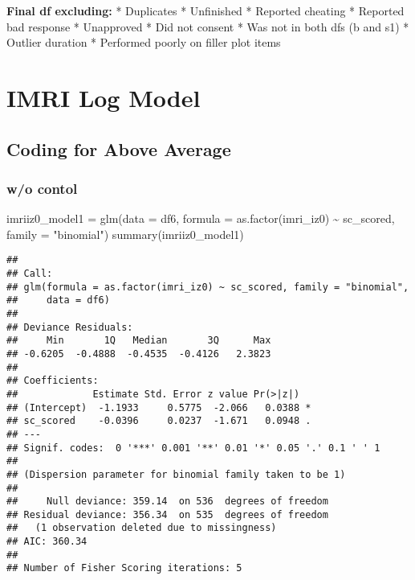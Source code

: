 \documentclass[
]{article}
\newenvironment{Shaded}{\begin{snugshade}}{\end{snugshade}}
\newcommand{\AttributeTok}[1]{\textcolor[rgb]{0.77,0.63,0.00}{#1}}
\newcommand{\FunctionTok}[1]{\textcolor[rgb]{0.00,0.00,0.00}{#1}}
\newcommand{\NormalTok}[1]{#1}
\newcommand{\OtherTok}[1]{\textcolor[rgb]{0.56,0.35,0.01}{#1}}
\newcommand{\SpecialCharTok}[1]{\textcolor[rgb]{0.00,0.00,0.00}{#1}}
\newcommand{\StringTok}[1]{\textcolor[rgb]{0.31,0.60,0.02}{#1}}
\begin{document}
\textbf{Final df excluding:} * Duplicates * Unfinished * Reported
cheating * Reported bad response * Unapproved * Did not consent * Was
not in both dfs (b and s1) * Outlier duration * Performed poorly on
filler plot items

\hypertarget{imri-log-model}{%
\section{IMRI Log Model}\label{imri-log-model}}

\hypertarget{coding-for-above-average-1}{%
\subsection{Coding for Above Average}\label{coding-for-above-average-1}}

\hypertarget{wo-contol}{%
\subsubsection{w/o contol}\label{wo-contol}}

\begin{Shaded}
\begin{Highlighting}[]
\NormalTok{imriiz0\_model1 }\OtherTok{=} \FunctionTok{glm}\NormalTok{(}\AttributeTok{data =}\NormalTok{ df6, }\AttributeTok{formula =} \FunctionTok{as.factor}\NormalTok{(imri\_iz0) }\SpecialCharTok{\textasciitilde{}}\NormalTok{ sc\_scored, }\AttributeTok{family =} \StringTok{"binomial"}\NormalTok{)}
\FunctionTok{summary}\NormalTok{(imriiz0\_model1)}
\end{Highlighting}
\end{Shaded}

\begin{verbatim}
## 
## Call:
## glm(formula = as.factor(imri_iz0) ~ sc_scored, family = "binomial", 
##     data = df6)
## 
## Deviance Residuals: 
##     Min       1Q   Median       3Q      Max  
## -0.6205  -0.4888  -0.4535  -0.4126   2.3823  
## 
## Coefficients:
##             Estimate Std. Error z value Pr(>|z|)  
## (Intercept)  -1.1933     0.5775  -2.066   0.0388 *
## sc_scored    -0.0396     0.0237  -1.671   0.0948 .
## ---
## Signif. codes:  0 '***' 0.001 '**' 0.01 '*' 0.05 '.' 0.1 ' ' 1
## 
## (Dispersion parameter for binomial family taken to be 1)
## 
##     Null deviance: 359.14  on 536  degrees of freedom
## Residual deviance: 356.34  on 535  degrees of freedom
##   (1 observation deleted due to missingness)
## AIC: 360.34
## 
## Number of Fisher Scoring iterations: 5
\end{verbatim}
\end{document}
